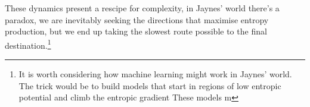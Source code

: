 \documentclass[11pt,a4paper]{article}
\begin{document}
These dynamics present a rescipe for complexity, in Jaynes' world there's a paradox, we are inevitably seeking the directions that maximise entropy production, but we end up taking the slowest route possible to the final destination.\footnote{It is worth considering how machine learning might work in Jaynes' world. The trick would be to build models that start in regions of low entropic potential and climb the entropic gradient These models m}



\printbibliography
\end{document}
